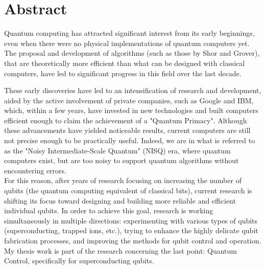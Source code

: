 \chapter{Abstract}

Quantum computing has attracted significant interest from its early beginnings, even when there were no physical implementations of quantum computers yet.
The proposal and development of algorithms (such as those by Shor and Grover), that are theoretically more efficient than what can be designed with classical computers, have led to significant progress in this field over the last decade.

These early discoveries have led to an intensification of research and development, aided by the active involvement of private companies, such as Google and IBM, which, within a few years, have invested in new technologies and built computers efficient enough to claim the achievement of a "Quantum Primacy".
%
Although these advancements have yielded noticeable results, current computers are still not precise enough to be practically useful.
Indeed, we are in what is referred to as the "Noisy Intermediate-Scale Quantum" (NISQ) era, where quantum computers exist, but are too noisy to support quantum algorithms without encountering errors.\\
%
For this reason, after years of research focusing on increasing the number of qubits (the quantum computing equivalent of classical bits), current research is shifting its focus toward designing and building more reliable and efficient individual qubits.
%
In order to achieve this goal, research is working simultaneously in multiple directions: experimenting with various types of qubits (superconducting, trapped ions, etc.), trying to enhance the highly delicate qubit fabrication processes, and improving the methods for qubit control and operation.\\
%
My thesis work is part of the research concerning the last point: Quantum Control, specifically for superconducting qubits.

